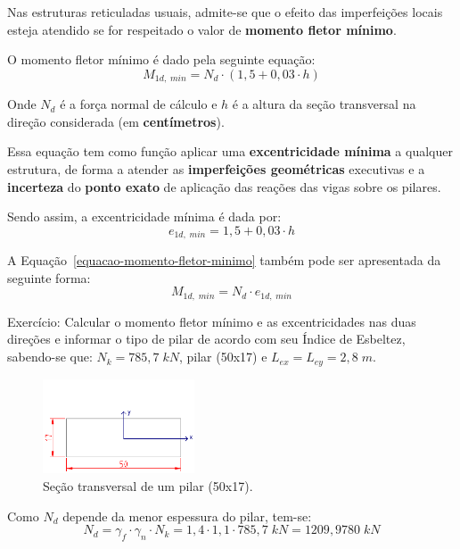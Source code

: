 Nas estruturas reticuladas usuais, admite-se que o efeito das imperfeições locais esteja atendido se for respeitado o valor de \textbf{momento fletor mínimo}.

O momento fletor mínimo é dado pela seguinte equação:
\begin{equation}
	\label{equacao-momento-fletor-minimo}
	M_{1d,\;min}=N_d\cdot(1,5+0,03\cdot h)
\end{equation}

Onde $N_d$ é a força normal de cálculo e $h$ é a altura da seção transversal na direção considerada (em \textbf{centímetros}).

Essa equação tem como função aplicar uma \textbf{excentricidade mínima} a qualquer estrutura, de forma a atender as \textbf{imperfeições geométricas} executivas e a \textbf{incerteza} do \textbf{ponto exato} de aplicação das reações das vigas sobre os pilares.

Sendo assim, a excentricidade mínima é dada por:
\begin{equation}e_{1d,\;min}=1,5+0,03\cdot h\end{equation}

A Equação~\eqref{equacao-momento-fletor-minimo} também pode ser apresentada da seguinte forma:
\begin{equation}M_{1d,\;min}=N_d\cdot e_{1d,\;min}\end{equation}

Exercício: Calcular o momento fletor mínimo e as excentricidades nas duas direções e informar o tipo de pilar de acordo com seu Índice de Esbeltez, sabendo-se que: $N_k=785,7\;kN$, pilar (50x17) e $L_{ex}=L_{ey}=2,8\;m$.

\begin{figure}[H]
	\begin{center}
	\caption{Seção transversal de um pilar (50x17).}
    	\includegraphics[width=0.4\textwidth]{Momento-fletor-minimo/Imagens/Secao-transversal-pilar-50x17.png}
	\end{center}
\end{figure}

Como $N_d$ depende da menor espessura do pilar, tem-se:
$$N_d=\gamma_f\cdot\gamma_n\cdot N_k=1,4\cdot1,1\cdot785,7\;kN=1209,9780\;kN$$

